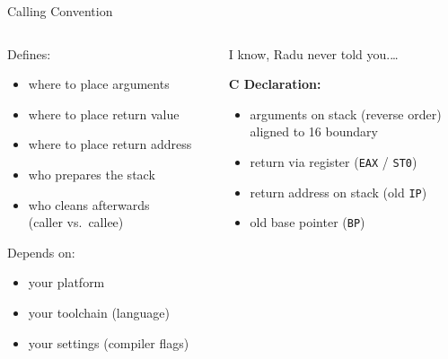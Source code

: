 \documentclass[beamer]{uibk}
\begin{document}
\begin{frame}{Calling Convention}
    \begin{columns}
        \begin{column}{0.5\textwidth}
            Defines:

            \begin{itemize}
                \item where to place arguments
                \item where to place return value
                \item where to place return address
                \item who prepares the stack
                \item who cleans afterwards\\
                    (caller vs.\ callee)
            \end{itemize}

            Depends on:

            \begin{itemize}
                \item your platform
                \item your toolchain (language)
                \item your settings (compiler flags)
            \end{itemize}

        \end{column}
        \begin{column}{0.5\textwidth}
            I know, Radu never told you.\dots

            \medskip

            \textbf{C Declaration:}

            \begin{itemize}
                \item arguments on stack (reverse order)\\
                    aligned to \SI{16}{\byte} boundary
                \item return via register (\texttt{EAX} / \texttt{ST0})
                \item return address on stack (old \texttt{IP})
                \item old base pointer (\texttt{BP})
            \end{itemize}
        \end{column}
    \end{columns}
\end{frame}
\end{document}
